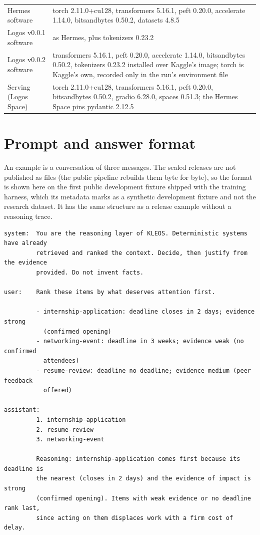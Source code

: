 \begin{table}[H]
\begin{tabular}{L{52mm}L{100mm}}
Hermes software & torch 2.11.0+cu128, transformers 5.16.1, peft 0.20.0, accelerate 1.14.0, bitsandbytes 0.50.2, datasets 4.8.5 \\
Logos v0.0.1 software & as Hermes, plus tokenizers 0.23.2 \\
Logos v0.0.2 software & transformers 5.16.1, peft 0.20.0, accelerate 1.14.0, bitsandbytes 0.50.2, tokenizers 0.23.2 installed over Kaggle's image; torch is Kaggle's own, recorded only in the run's environment file \\
Serving (Logos Space) & torch 2.11.0+cu128, transformers 5.16.1, peft 0.20.0, bitsandbytes 0.50.2, gradio 6.28.0, spaces 0.51.3; the Hermes Space pins pydantic 2.12.5 \\
\bottomrule
\end{tabular}
\end{table}

\section{Prompt and answer format}\label{app:format}
An example is a conversation of three messages. The sealed releases are not published as files (the public pipeline rebuilds them byte for byte), so the format is shown here on the first public development fixture shipped with the training harness, which its metadata marks as a synthetic development fixture and not the research dataset. It has the same structure as a release example without a reasoning trace.

\begin{small}
\begin{verbatim}
system:  You are the reasoning layer of KLEOS. Deterministic systems have already
         retrieved and ranked the context. Decide, then justify from the evidence
         provided. Do not invent facts.

user:    Rank these items by what deserves attention first.

         - internship-application: deadline closes in 2 days; evidence strong
           (confirmed opening)
         - networking-event: deadline in 3 weeks; evidence weak (no confirmed
           attendees)
         - resume-review: deadline no deadline; evidence medium (peer feedback
           offered)

assistant:
         1. internship-application
         2. resume-review
         3. networking-event

         Reasoning: internship-application comes first because its deadline is
         the nearest (closes in 2 days) and the evidence of impact is strong
         (confirmed opening). Items with weak evidence or no deadline rank last,
         since acting on them displaces work with a firm cost of delay.
\end{verbatim}
\end{small}

